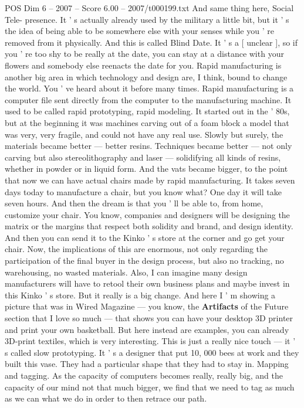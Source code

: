 \begin{textsample}{POS Dim 6 – 2007 – Score 6.00 – 2007/t000199.txt}
And same thing here, Social Tele- presence.
It ' s actually already used by the military a little bit, but it ' s the idea of being able to be somewhere else with your senses while you ' re removed from it physically.
And this is called Blind Date.
It ' s a [ unclear ], so if you ' re too shy to be really at the date, you can stay at a distance with your flowers and somebody else reenacts the date for you.
Rapid manufacturing is another big area in which technology and design are, I think, bound to change the world.
You ' ve heard about it before many times.
Rapid manufacturing is a computer file sent directly from the computer to the manufacturing machine.
It used to be called rapid prototyping, rapid modeling.
It started out in the ' 80s, but at the beginning it was machines carving out of a foam block a model that was very, very fragile, and could not have any real use.
Slowly but surely, the materials became better — better resins.
Techniques became better — not only carving but also stereolithography and laser — solidifying all kinds of resins, whether in powder or in liquid form.
And the vats became bigger, to the point that now we can have actual chairs made by rapid manufacturing.
It takes seven days today to manufacture a chair, but you know what?
One day it will take seven hours.
And then the dream is that you ' ll be able to, from home, customize your chair.
You know, companies and designers will be designing the matrix or the margins that respect both solidity and brand, and design identity.
And then you can send it to the Kinko ' s store at the corner and go get your chair.
Now, the implications of this are enormous, not only regarding the participation of the final buyer in the design process, but also no tracking, no warehousing, no wasted materials.
Also, I can imagine many design manufacturers will have to retool their own business plans and maybe invest in this Kinko ' s store.
But it really is a big change.
And here I ' m showing a picture that was in Wired Magazine — you know, the \textbf{Artifacts} of the Future section that I love so much — that shows you can have your desktop 3D printer and print your own basketball.
But here instead are examples, you can already 3D-print textiles, which is very interesting.
This is just a really nice touch — it ' s called slow prototyping.
It ' s a designer that put 10, 000 bees at work and they built this vase.
They had a particular shape that they had to stay in.
Mapping and tagging.
As the capacity of computers becomes really, really big, and the capacity of our mind not that much bigger, we find that we need to tag as much as we can what we do in order to then retrace our path.

\end{textsample}
